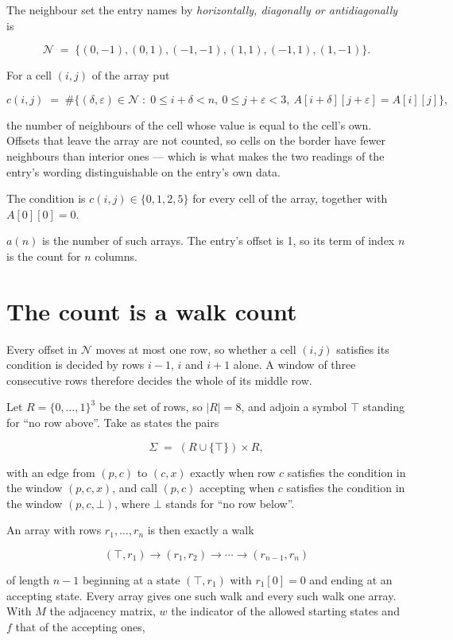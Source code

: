 \documentclass[11pt]{article}
\theoremstyle{definition}
\begin{document}
The neighbour set the entry names by {\itshape horizontally, diagonally or antidiagonally} is

\[\mathcal{N} \;=\; \{(0,-1), (0,1), (-1,-1), (1,1), (-1,1), (1,-1)\}.\]

For a cell $(i,j)$ of the array put

\[c(i,j) \;=\; \#\bigl\{(\delta,\varepsilon)\in\mathcal{N} \;:\; 0\le i+\delta<n,\ 0\le j+\varepsilon<3,\ A[i+\delta][j+\varepsilon] = A[i][j]\bigr\},\]

the number of neighbours of the cell whose value is equal to the cell's own. Offsets that leave the array are not counted, so cells on the border have fewer neighbours than interior ones --- which is what makes the two readings of the entry's wording distinguishable on the entry's own data.

The condition is $c(i,j) \in \{0, 1, 2, 5\}$ for every cell of the array, together with $A[0][0]=0$.

$a(n)$ is the number of such arrays. The entry's offset is 1, so its term of index $n$ is the count for $n$ columns.

\section{The count is a walk count}

Every offset in $\mathcal{N}$ moves at most one row, so whether a cell $(i,j)$ satisfies its condition is decided by rows $i-1$, $i$ and $i+1$ alone. A window of three consecutive rows therefore decides the whole of its middle row.

Let $R = \{0,\dots,1\}^{3}$ be the set of rows, so $|R| = 8$, and adjoin a symbol $\top$ standing for ``no row above''. Take as states the pairs

\[\Sigma \;=\; (R \cup \{\top\}) \times R,\]

with an edge from $(p,c)$ to $(c,x)$ exactly when row $c$ satisfies the condition in the window $(p,c,x)$, and call $(p,c)$ accepting when $c$ satisfies the condition in the window $(p,c,\bot)$, where $\bot$ stands for ``no row below''.

An array with rows $r_1,\dots,r_n$ is then exactly a walk

\[(\top,r_1) \to (r_1,r_2) \to \cdots \to (r_{n-1},r_n)\]

of length $n-1$ beginning at a state $(\top,r_1)$ with $r_1[0]=0$ and ending at an accepting state. Every array gives one such walk and every such walk one array. With $M$ the adjacency matrix, $w$ the indicator of the allowed starting states and $f$ that of the accepting ones,
\end{document}
